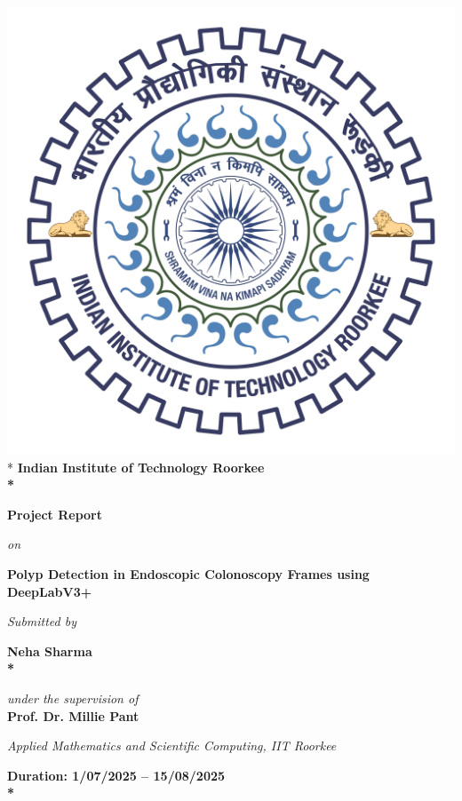 \documentclass[a4paper,12pt]{report}
\begin{document}
\title{}
\begin{center}
\thispagestyle{empty}
 \includegraphics[scale=0.085]{logo.pdf}\\*
\Large\bfseries{Indian Institute of Technology Roorkee}\\*
\vspace{1.5cm}
\end{center}
\begin{center}
\Large\bfseries{Project Report}
\end{center}
\begin{center}
\textit{on}
\end{center}
\begin{center}
\Large\bfseries{Polyp Detection in Endoscopic Colonoscopy Frames using DeepLabV3+}
\end{center}
\begin{center}
\textit{Submitted by}
\end{center}
\begin{center}
\Large\bfseries{Neha Sharma}\\*
\end{center}
\begin{center}
\textit{under the supervision of}\\
\Large\bfseries{Prof. Dr.  Millie Pant}\\
\end{center}
\begin{center}
\textit{Applied Mathematics and Scientific Computing, IIT Roorkee}\\
\end{center}
\begin{center}
\Large\bfseries{Duration: 1/07/2025 – 15/08/2025 }\\*
\end{center}
\end{document}
